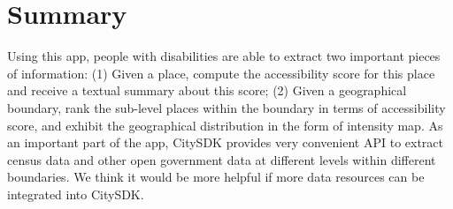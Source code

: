 \documentclass[10pt]{article}
\begin{document}
 \section{Summary}
 Using this app, people with disabilities are able to extract two important pieces of information: (1) Given a place, compute the accessibility score for this place and receive a textual summary about this score; (2) Given a geographical boundary, rank the sub-level places within the boundary in terms of accessibility score, and exhibit the geographical distribution in the form of intensity map. As an important part of the app, CitySDK provides very convenient API to extract census data and other open government data at different levels within different boundaries. We think it would be more helpful if more data resources can be integrated into CitySDK. 
%
%
%




%
%
\end{document}
